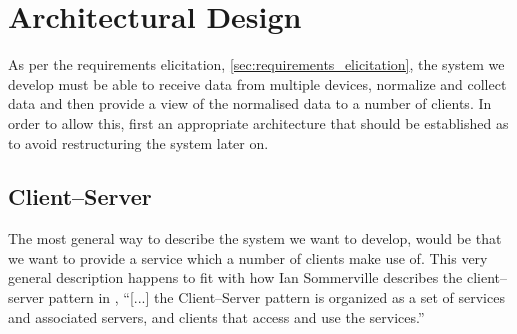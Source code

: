 





\section{Architectural Design}\label{sec:architectural_design}
As per the requirements elicitation, \cref{sec:requirements_elicitation}, the system we develop must be able to receive data from multiple devices, normalize and collect data and then provide a view of the normalised data to a number of clients.
In order to allow this, first an appropriate architecture that should be established as to avoid restructuring the system later on.

\subsection{Client--Server}
The most general way to describe the system we want to develop, would be that we want to provide a service which a number of clients make use of.
This very general description happens to fit with how Ian Sommerville describes the client--server pattern in \cite{software_engineering},
``[...] the Client--Server pattern is organized as a set of services and associated servers, and clients that access and use the services.''

